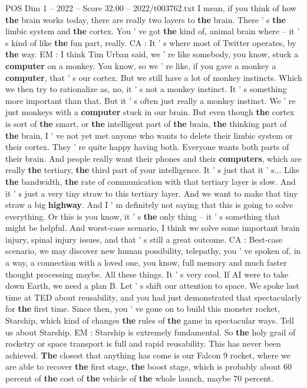 \begin{textsample}{POS Dim 1 – 2022 – Score 32.00 – 2022/t003762.txt}
I mean, if you think of how \textbf{the} brain works today, there are really two layers to \textbf{the} brain.
There ' s \textbf{the} limbic system and \textbf{the} cortex.
You ' ve got \textbf{the} kind of, animal brain where -- it ' s kind of like \textbf{the} fun part, really.
CA : It ' s where most of Twitter operates, by \textbf{the} way.
EM : I think Tim Urban said, we ' re like somebody, you know, stuck a \textbf{computer} on a monkey.
You know, so we ' re like, if you gave a monkey a \textbf{computer}, that ' s our cortex.
But we still have a lot of monkey instincts.
Which we then try to rationalize as, no, it ' s not a monkey instinct.
It ' s something more important than that.
But it ' s often just really a monkey instinct.
We ' re just monkeys with a \textbf{computer} stuck in our brain.
But even though \textbf{the} cortex is sort of \textbf{the} smart, or \textbf{the} intelligent part of \textbf{the} brain, \textbf{the} thinking part of \textbf{the} brain, I ' ve not yet met anyone who wants to delete their limbic system or their cortex.
They ' re quite happy having both.
Everyone wants both parts of their brain.
And people really want their phones and their \textbf{computers}, which are really \textbf{the} tertiary, \textbf{the} third part of your intelligence.
It ' s just that it ' s...
Like \textbf{the} bandwidth, \textbf{the} rate of communication with that tertiary layer is slow.
And it ' s just a very tiny straw to this tertiary layer.
And we want to make that tiny straw a big \textbf{highway}.
And I ' m definitely not saying that this is going to solve everything.
Or this is you know, it ' s \textbf{the} only thing -- it ' s something that might be helpful.
And worst-case scenario, I think we solve some important brain injury, spinal injury issues, and that ' s still a great outcome.
CA : Best-case scenario, we may discover new human possibility, telepathy, you ' ve spoken of, in a way, a connection with a loved one, you know, full memory and much faster thought processing maybe.
All these things.
It ' s very cool.
If AI were to take down Earth, we need a plan B.
Let ' s shift our attention to space.
We spoke last time at TED about reusability, and you had just demonstrated that spectacularly for \textbf{the} first time.
Since then, you ' ve gone on to build this monster rocket, Starship, which kind of changes \textbf{the} rules of \textbf{the} game in spectacular ways.
Tell us about Starship.
EM : Starship is extremely fundamental.
So \textbf{the} holy grail of rocketry or space transport is full and rapid reusability.
This has never been achieved. \textbf{The} closest that anything has come is our Falcon 9 rocket, where we are able to recover \textbf{the} first stage, \textbf{the} boost stage, which is probably about 60 percent of \textbf{the} cost of \textbf{the} vehicle of \textbf{the} whole launch, maybe 70 percent.

\end{textsample}
